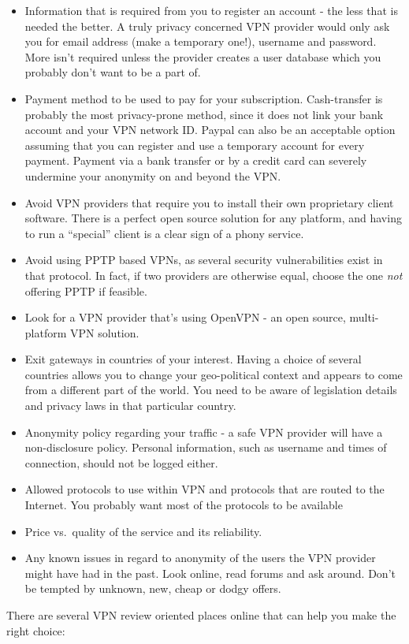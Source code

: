 \begin{itemize}
\item
  Information that is required from you to register an account - the
  less that is needed the better. A truly privacy concerned VPN provider
  would only ask you for email address (make a temporary one!), username
  and password. More isn't required unless the provider creates a user
  database which you probably don't want to be a part of.
\item
  Payment method to be used to pay for your subscription. Cash-transfer
  is probably the most privacy-prone method, since it does not link your
  bank account and your VPN network ID. Paypal can also be an acceptable
  option assuming that you can register and use a temporary account for
  every payment. Payment via a bank transfer or by a credit card can
  severely undermine your anonymity on and beyond the VPN.
\item
  Avoid VPN providers that require you to install their own proprietary
  client software. There is a perfect open source solution for any
  platform, and having to run a ``special'' client is a clear sign of a
  phony service.
\item
  Avoid using PPTP based VPNs, as several security vulnerabilities exist
  in that protocol. In fact, if two providers are otherwise equal,
  choose the one \emph{not} offering PPTP if feasible.
\item
  Look for a VPN provider that's using OpenVPN - an open source,
  multi-platform VPN solution.
\item
  Exit gateways in countries of your interest. Having a choice of
  several countries allows you to change your geo-political context and
  appears to come from a different part of the world. You need to be
  aware of legislation details and privacy laws in that particular
  country.
\item
  Anonymity policy regarding your traffic - a safe VPN provider will
  have a non-disclosure policy. Personal information, such as username
  and times of connection, should not be logged either.
\item
  Allowed protocols to use within VPN and protocols that are routed to
  the Internet. You probably want most of the protocols to be available
\item
  Price vs.~quality of the service and its reliability.
\item
  Any known issues in regard to anonymity of the users the VPN provider
  might have had in the past. Look online, read forums and ask around.
  Don't be tempted by unknown, new, cheap or dodgy offers.
\end{itemize}
There are several VPN review oriented places online that can help you
make the right choice:

